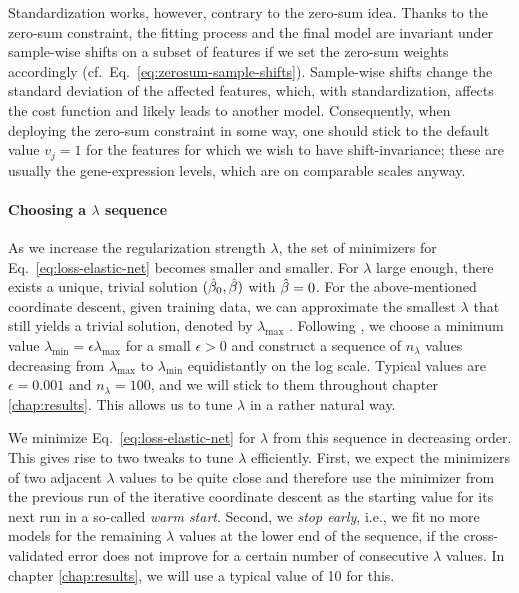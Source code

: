 Standardization works, however, contrary to the zero-sum idea. Thanks to the 
zero-sum constraint, the fitting process and the final model are invariant under sample-wise 
shifts on a subset of features if we set the zero-sum weights accordingly (cf.\ Eq.\ 
\eqref{eq:zerosum-sample-shifts}). Sample-wise shifts 
change the standard deviation of the affected features, which, with standardization,
affects the cost function and likely leads to another model. 
Consequently, when deploying the zero-sum constraint in some way, one should stick to the default 
value $v_j = 1$ for the features for which we wish to have shift-invariance; these are usually the 
gene-expression levels, which are on comparable scales anyway.

\paragraph{Choosing a $\lambda$ sequence}
As we increase the regularization strength $\lambda$, the set of minimizers for
Eq.\ \eqref{eq:loss-elastic-net} becomes smaller and smaller. For $\lambda$ large enough, there exists 
a unique, trivial solution $(\hat{\beta}_0, \hat{\beta})$ with $\hat{\beta} = 0$. For the above-mentioned 
coordinate descent, given 
training data, we can approximate the smallest $\lambda$ that still yields a 
trivial solution, denoted by $\lambda_\text{max}$ \cite[section 3.3]{rehberg-thesis18}. Following 
\cite[section 2.5]{regularization-path10}, we choose a minimum value $\lambda_\text{min} = 
\epsilon \lambda_\text{max}$ for a small $\epsilon > 0$ and 
construct a sequence of $n_\lambda$ values decreasing from $\lambda_\text{max}$ to 
$\lambda_\text{min}$ equidistantly on the log scale. Typical values are $\epsilon = \num{0.001}$ and
$n_\lambda = \num{100}$, and we will stick to them throughout chapter \ref{chap:results}. This 
allows us to tune $\lambda$ in a rather natural way.

We minimize Eq.\ \eqref{eq:loss-elastic-net} for $\lambda$ from this sequence in decreasing order. This gives rise 
to two tweaks to tune $\lambda$ efficiently. First, we expect the minimizers of two adjacent $\lambda$ 
values to be quite close and therefore use the minimizer from the previous run of the iterative coordinate 
descent as the starting value for its next run in a so-called \textit{warm start}. Second, we 
\textit{stop early}, i.e., we fit no more models for the remaining $\lambda$ values at the lower end of the 
sequence, if the cross-validated error does not improve for a certain number of consecutive 
$\lambda$ values. In chapter \ref{chap:results}, we will use a typical value of \num{10} for this.

